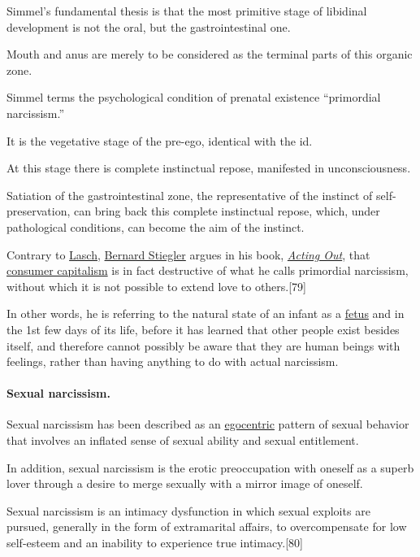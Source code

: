 \documentclass[oneside]{book}
\numberwithin{equation}{section}
\begin{document}
Simmel's fundamental thesis is that the most primitive stage of libidinal development is not the oral, but the gastrointestinal one.

Mouth and anus are merely to be considered as the terminal parts of this organic zone.

Simmel terms the psychological condition of prenatal existence ``primordial narcissism.''

It is the vegetative stage of the pre-ego, identical with the id.

At this stage there is complete instinctual repose, manifested in unconsciousness.

Satiation of the gastrointestinal zone, the representative of the instinct of self-preservation, can bring back this complete instinctual repose, which, under pathological conditions, can become the aim of the instinct.

Contrary to \href{https://en.wikipedia.org/wiki/Christopher_Lasch}{Lasch}, \href{https://en.wikipedia.org/wiki/Bernard_Stiegler}{Bernard Stiegler} argues in his book, \href{https://en.wikipedia.org/wiki/Acting_Out_(book)}{\textit{Acting Out}}, that \href{https://en.wikipedia.org/wiki/Consumer_capitalism}{consumer capitalism} is in fact destructive of what he calls primordial narcissism, without which it is not possible to extend love to others.[79]

In other words, he is referring to the natural state of an infant as a \href{https://en.wikipedia.org/wiki/Human_fetus}{fetus} and in the 1st few days of its life, before it has learned that other people exist besides itself, and therefore cannot possibly be aware that they are human beings with feelings, rather than having anything to do with actual narcissism.

\paragraph{Sexual narcissism.} Sexual narcissism has been described as an \href{https://en.wikipedia.org/wiki/Egocentric}{egocentric} pattern of sexual behavior that involves an inflated sense of sexual ability and sexual entitlement.

In addition, sexual narcissism is the erotic preoccupation with oneself as a superb lover through a desire to merge sexually with a mirror image of oneself.

Sexual narcissism is an intimacy dysfunction in which sexual exploits are pursued, generally in the form of extramarital affairs, to overcompensate for low self-esteem and an inability to experience true intimacy.[80]
\end{document}
